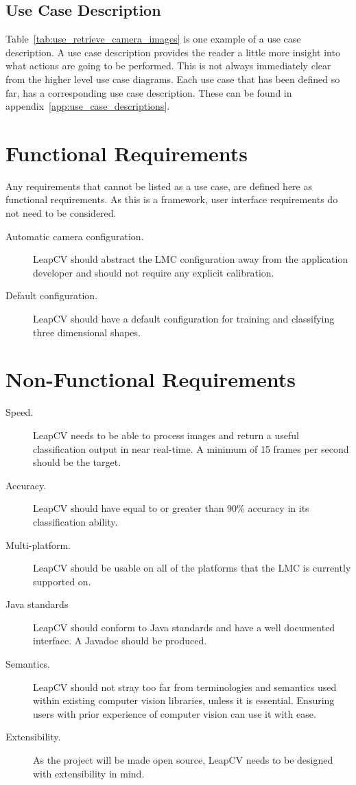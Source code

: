 \documentclass[11pt,oneside]{report}
\begin{document}
			\subsection{Use Case Description}
			Table~\ref{tab:use_retrieve_camera_images} is one example of a use case description.
			A use case description provides the reader a little more insight into what actions are going to be performed.
			This is not always immediately clear from the higher level use case diagrams.
			Each use case that has been defined so far, has a corresponding use case description.
			These can be found in appendix~\ref{app:use_case_descriptions}.
			
		\clearpage
		\section{Functional Requirements}
			Any requirements that cannot be listed as a use case, are defined here as functional requirements.
			As this is a framework, user interface requirements do not need to be considered.
			\begin{description}
				\item[Automatic camera configuration.] LeapCV should abstract the LMC configuration away from the application developer and should not require any explicit calibration.
				\item[Default configuration.] LeapCV should have a default configuration for training and classifying three dimensional shapes.
			\end{description}
				
			
		\section{Non-Functional Requirements}
			\begin{description}
				\item[Speed.] LeapCV needs to be able to process images and return a useful classification output in near real-time. 
				A minimum of 15 frames per second should be the target.
				\item[Accuracy.] LeapCV should have equal to or greater than 90\% accuracy in its classification ability.
				\item[Multi-platform.] LeapCV should be usable on all of the platforms that the LMC is currently supported on.
				\item[Java standards] LeapCV should conform to Java standards and have a well documented interface.
				A Javadoc should be produced.
				\item[Semantics.] LeapCV should not stray too far from terminologies and semantics used within existing computer vision libraries, unless it is essential. Ensuring users with prior experience of computer vision can use it with ease.
				\item[Extensibility.] As the project will be made open source, LeapCV needs to be designed with extensibility in mind.
			\end{description}
			
\end{document}

